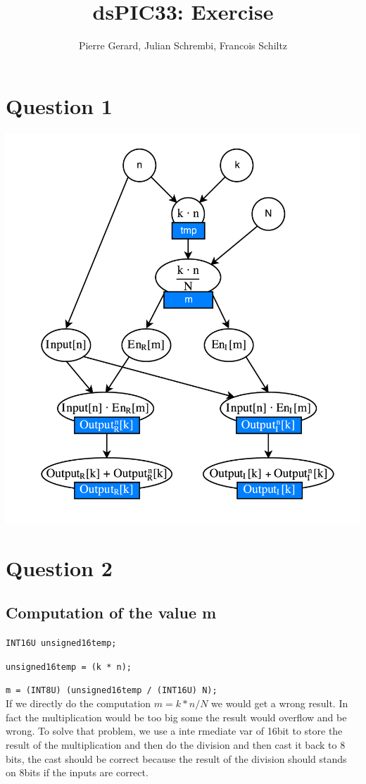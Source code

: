 \documentclass[a4paper]{article}
\title{dsPIC33: Exercise}
\author{Pierre Gerard, Julian Schrembi, Francois Schiltz}
\begin{document}
\maketitle

\section{Question 1}

\includegraphics[scale=1]{files/elect-01.png} 

\section{Question 2}

\subsection{Computation of the value m}


\verb|INT16U unsigned16temp;|

\verb|unsigned16temp = (k * n);|

\verb|m = (INT8U) (unsigned16temp / (INT16U) N);|
\\

If we directly do the computation $ m = k*n/N $ we would get a wrong result. In fact the multiplication would be too big some the result would overflow and be wrong. To solve that problem, we use a inte rmediate var of 16bit to store the result of the multiplication and then do the division and then cast it back to 8 bits, the cast should be correct because the result of the division should stands on 8bits if the inputs are correct.
\end{document}
